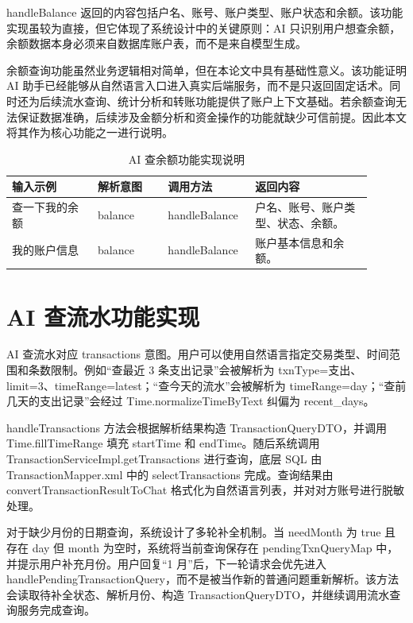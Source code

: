\documentclass[bachelor, print]{xduthesis}
\begin{document}
handleBalance 返回的内容包括户名、账号、账户类型、账户状态和余额。该功能实现虽较为直接，但它体现了系统设计中的关键原则：AI 只识别用户想查余额，余额数据本身必须来自数据库账户表，而不是来自模型生成。

余额查询功能虽然业务逻辑相对简单，但在本论文中具有基础性意义。该功能证明 AI 助手已经能够从自然语言入口进入真实后端服务，而不是只返回固定话术。同时还为后续流水查询、统计分析和转账功能提供了账户上下文基础。若余额查询无法保证数据准确，后续涉及金额分析和资金操作的功能就缺少可信前提。因此本文将其作为核心功能之一进行说明。

\begin{table}[H]
    \centering
    \caption{AI 查余额功能实现说明}
    \label{tab:balance}
    \begin{tabular}{|p{0.22\linewidth}|p{0.18\linewidth}|p{0.2\linewidth}|p{0.3\linewidth}|}
        \hline
        输入示例 & 解析意图 & 调用方法 & 返回内容 \\
        \hline
        查一下我的余额 & balance & handleBalance & 户名、账号、账户类型、状态、余额。 \\
        \hline
        我的账户信息 & balance & handleBalance & 账户基本信息和余额。 \\
        \hline
    \end{tabular}
\end{table}

\section{AI 查流水功能实现}

AI 查流水对应 transactions 意图。用户可以使用自然语言指定交易类型、时间范围和条数限制。例如“查最近 3 条支出记录”会被解析为 txnType=支出、limit=3、timeRange=latest；“查今天的流水”会被解析为 timeRange=day；“查前几天的支出记录”会经过 Time.normalizeTimeByText 纠偏为 recent\_days。

handleTransactions 方法会根据解析结果构造 TransactionQueryDTO，并调用 Time.fillTimeRange 填充 startTime 和 endTime。随后系统调用 TransactionServiceImpl.getTransactions 进行查询，底层 SQL 由 TransactionMapper.xml 中的 selectTransactions 完成。查询结果由 convertTransactionResultToChat 格式化为自然语言列表，并对对方账号进行脱敏处理。

对于缺少月份的日期查询，系统设计了多轮补全机制。当 needMonth 为 true 且存在 day 但 month 为空时，系统将当前查询保存在 pendingTxnQueryMap 中，并提示用户补充月份。用户回复“1 月”后，下一轮请求会优先进入 handlePendingTransactionQuery，而不是被当作新的普通问题重新解析。该方法会读取待补全状态、解析月份、构造 TransactionQueryDTO，并继续调用流水查询服务完成查询。
\end{document}
